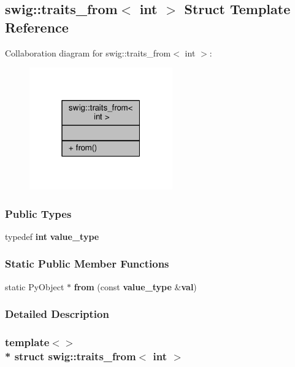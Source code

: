 \subsection{swig\+:\+:traits\+\_\+from$<$ int $>$ Struct Template Reference}
\label{structswig_1_1traits__from_3_01int_01_4}


Collaboration diagram for swig\+:\+:traits\+\_\+from$<$ int $>$\+:
\nopagebreak
\begin{figure}[H]
\begin{center}
\leavevmode
\includegraphics[width=175pt]{da/d58/structswig_1_1traits__from_3_01int_01_4__coll__graph}
\end{center}
\end{figure}
\subsubsection*{Public Types}
\begin{DoxyCompactItemize}
\item 
typedef {\bf int} {\bf value\+\_\+type}
\end{DoxyCompactItemize}
\subsubsection*{Static Public Member Functions}
\begin{DoxyCompactItemize}
\item 
static Py\+Object $\ast$ {\bf from} (const {\bf value\+\_\+type} \&{\bf val})
\end{DoxyCompactItemize}


\subsubsection{Detailed Description}
\subsubsection*{template$<$$>$\\*
struct swig\+::traits\+\_\+from$<$ int $>$}



